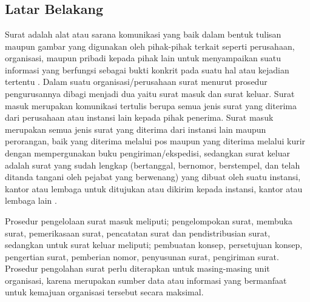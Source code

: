 %
%
%
%

\chapter{\babSatu}

\section{Latar Belakang}
Surat adalah alat atau sarana komunikasi yang baik dalam bentuk tulisan maupun gambar yang digunakan oleh pihak-pihak terkait seperti perusahaan, organisasi, maupun pribadi kepada pihak lain untuk menyampaikan suatu informasi yang berfungsi sebagai bukti konkrit pada suatu hal atau kejadian tertentu \cite{triyono2013pembuatan}. Dalam suatu organisasi/perusahaan surat menurut prosedur pengurusannya dibagi menjadi dua yaitu surat masuk dan surat keluar. Surat masuk merupakan komunikasi tertulis berupa semua jenis surat yang diterima dari perusahaan atau instansi lain kepada pihak penerima. Surat masuk merupakan semua jenis surat yang diterima dari instansi lain maupun perorangan, baik yang diterima melalui pos maupun yang diterima melalui kurir dengan mempergunakan buku pengiriman/ekspedisi, sedangkan surat keluar adalah surat yang sudah lengkap (bertanggal, bernomor, berstempel, dan telah ditanda tangani oleh pejabat yang berwenang) yang dibuat oleh suatu instansi, kantor atau lembaga untuk ditujukan atau dikirim kepada instansi, kantor atau lembaga lain \cite{suherman2017sistem}.

Prosedur pengelolaan surat masuk meliputi; pengelompokan surat, membuka surat, pemerikasaan surat, pencatatan surat dan pendistribusian surat, sedangkan untuk surat keluar meliputi; pembuatan konsep, persetujuan konsep, pengertian surat, pemberian nomor, penyusunan surat, pengiriman surat. Prosedur pengolahan surat perlu diterapkan untuk masing-masing unit organisasi, karena merupakan sumber data atau informasi yang bermanfaat untuk kemajuan organisasi tersebut secara maksimal.

